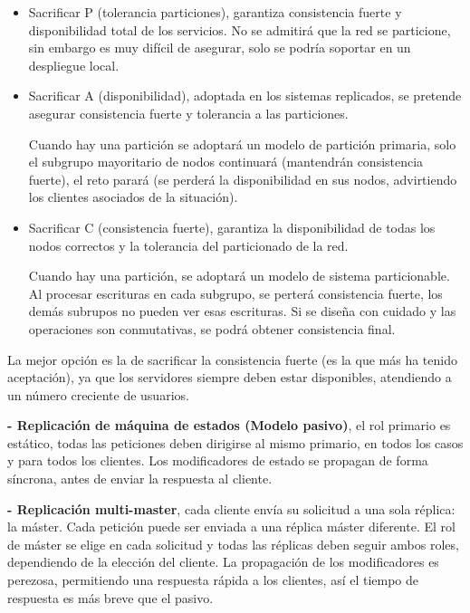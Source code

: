 \documentclass[12pt]{amsart}
\begin{document}
    \begin{itemize}
    \item Sacrificar P (tolerancia particiones), garantiza consistencia fuerte y disponibilidad total de los servicios. No se admitirá que la red se particione, sin embargo es  muy difícil de asegurar, solo se podría soportar en un despliegue local.
    
    \item Sacrificar A (disponibilidad), adoptada en los sistemas replicados, se pretende asegurar consistencia fuerte y tolerancia a las particiones.
    
    \subitem Cuando hay una partición se adoptará un modelo de partición primaria, solo el subgrupo mayoritario de nodos continuará (mantendrán consistencia fuerte), el reto parará (se perderá la disponibilidad en sus nodos, advirtiendo los clientes asociados de la situación).
    
    \item Sacrificar C (consistencia fuerte), garantiza la disponibilidad de todas los nodos correctos y la tolerancia del particionado de la red.
    
    \subitem Cuando hay una partición, se adoptará un modelo de sistema particionable. Al procesar escrituras en cada subgrupo, se perterá consistencia fuerte, los demás subrupos no pueden ver esas escrituras.
    Si se diseña con cuidado y las operaciones son conmutativas, se podrá obtener consistencia final.
    \end{itemize}
    
    La mejor opción es la de sacrificar la consistencia fuerte (es la que más ha tenido aceptación), ya que los servidores siempre deben estar disponibles, atendiendo a un número creciente de usuarios.
    
    \medskip
    
    \textbf{- Replicación de máquina de estados (Modelo pasivo)}, el rol primario es estático, todas las peticiones deben dirigirse al mismo primario, en todos los casos y para todos los clientes. Los modificadores de estado se propagan de forma síncrona, antes de enviar la respuesta al cliente.
    
    \textbf{- Replicación multi-master}, cada cliente envía su solicitud a una sola réplica: la máster. Cada petición puede ser enviada a una réplica máster diferente. El rol de máster se elige en cada solicitud y todas las réplicas deben seguir ambos roles, dependiendo de la elección del cliente. La propagación de los modificadores es perezosa, permitiendo una respuesta rápida a los clientes, así el tiempo de respuesta es más breve que el pasivo.
    
\end{document}
